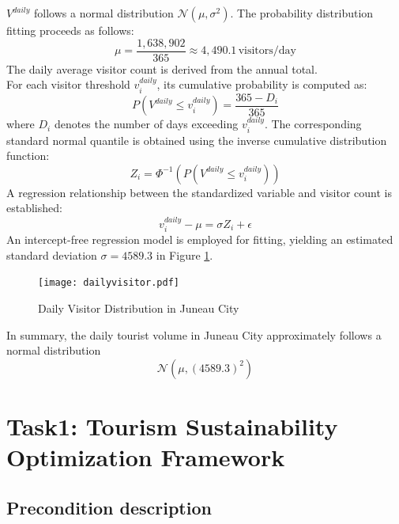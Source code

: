\documentclass{mcmthesis}
\begin{document}
\begin{itemize}
  $V^{daily}$ follows a normal distribution $\mathcal{N}(\mu, \sigma^2)$. The probability distribution fitting proceeds as follows:
  $$\mu = \frac{1{,}638{,}902}{365} \approx 4{,}490.1 \, \text{visitors/day}$$
  The daily average visitor count is derived from the annual total.\\
  For each visitor threshold $v^{daily}_i$, its cumulative probability is computed as:
  $$P(V^{daily} \leq v^{daily}_i) = \frac{365 - D_i}{365}$$
  where $D_i$ denotes the number of days exceeding $v^{daily}_i$. The corresponding standard normal quantile is obtained using the inverse cumulative distribution function:
  $$Z_i = \Phi^{-1} \left( P(V^{daily} \leq v^{daily}_i) \right)$$
  A regression relationship between the standardized variable and visitor count is established:
  $$v^{daily}_i - \mu = \sigma Z_i + \epsilon$$
  An intercept-free regression model is employed for fitting, yielding an estimated standard deviation $\sigma = 4589.3$ in Figure \ref{fig:dailyvisitor}.\par
  \begin{figure}
    \centering
    \texttt{[image: dailyvisitor.pdf]}
    \caption{Daily Visitor Distribution in Juneau City} \label{fig:dailyvisitor}
  \end{figure}
  In summary, the daily tourist volume in Juneau City approximately follows a normal distribution 
  \begin{equation}
    \label{eq:dailyvisitor}
    \mathcal{N}(\mu, (4589.3)^2)
  \end{equation}
  
  
\end{itemize}




  
\section{Task1: Tourism Sustainability Optimization Framework}
\subsection{Precondition description}
\end{document}
